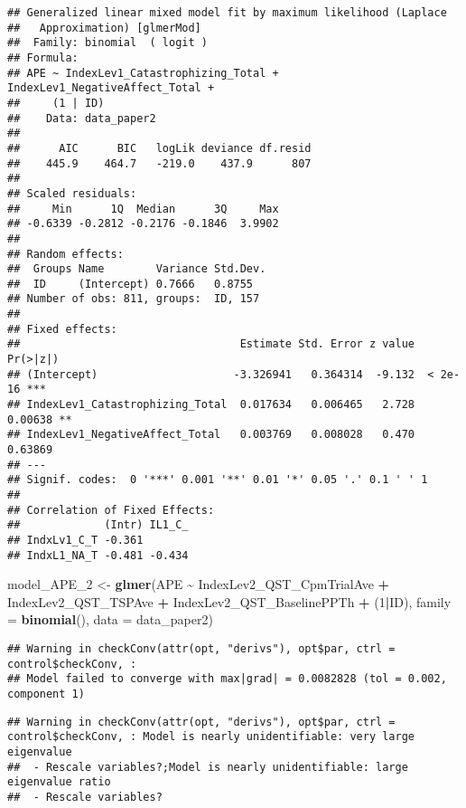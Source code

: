 \documentclass[
  12pt,
]{article}
\newenvironment{Shaded}{\begin{snugshade}}{\end{snugshade}}
\newcommand{\AttributeTok}[1]{\textcolor[rgb]{0.13,0.29,0.53}{#1}}
\newcommand{\DecValTok}[1]{\textcolor[rgb]{0.00,0.00,0.81}{#1}}
\newcommand{\FunctionTok}[1]{\textcolor[rgb]{0.13,0.29,0.53}{\textbf{#1}}}
\newcommand{\NormalTok}[1]{#1}
\newcommand{\OtherTok}[1]{\textcolor[rgb]{0.56,0.35,0.01}{#1}}
\newcommand{\SpecialCharTok}[1]{\textcolor[rgb]{0.81,0.36,0.00}{\textbf{#1}}}
\begin{document}
\begin{verbatim}
## Generalized linear mixed model fit by maximum likelihood (Laplace
##   Approximation) [glmerMod]
##  Family: binomial  ( logit )
## Formula: 
## APE ~ IndexLev1_Catastrophizing_Total + IndexLev1_NegativeAffect_Total +  
##     (1 | ID)
##    Data: data_paper2
## 
##      AIC      BIC   logLik deviance df.resid 
##    445.9    464.7   -219.0    437.9      807 
## 
## Scaled residuals: 
##     Min      1Q  Median      3Q     Max 
## -0.6339 -0.2812 -0.2176 -0.1846  3.9902 
## 
## Random effects:
##  Groups Name        Variance Std.Dev.
##  ID     (Intercept) 0.7666   0.8755  
## Number of obs: 811, groups:  ID, 157
## 
## Fixed effects:
##                                  Estimate Std. Error z value Pr(>|z|)    
## (Intercept)                     -3.326941   0.364314  -9.132  < 2e-16 ***
## IndexLev1_Catastrophizing_Total  0.017634   0.006465   2.728  0.00638 ** 
## IndexLev1_NegativeAffect_Total   0.003769   0.008028   0.470  0.63869    
## ---
## Signif. codes:  0 '***' 0.001 '**' 0.01 '*' 0.05 '.' 0.1 ' ' 1
## 
## Correlation of Fixed Effects:
##             (Intr) IL1_C_
## IndxLv1_C_T -0.361       
## IndxL1_NA_T -0.481 -0.434
\end{verbatim}

\begin{Shaded}
\begin{Highlighting}[]
\NormalTok{model\_APE\_2 }\OtherTok{\textless{}{-}} \FunctionTok{glmer}\NormalTok{(APE }\SpecialCharTok{\textasciitilde{}}\NormalTok{ IndexLev2\_QST\_CpmTrialAve }\SpecialCharTok{+}\NormalTok{ IndexLev2\_QST\_TSPAve }\SpecialCharTok{+}\NormalTok{ IndexLev2\_QST\_BaselinePPTh }\SpecialCharTok{+}\NormalTok{ (}\DecValTok{1}\SpecialCharTok{|}\NormalTok{ID), }\AttributeTok{family =} \FunctionTok{binomial}\NormalTok{(), }\AttributeTok{data =}\NormalTok{ data\_paper2)}
\end{Highlighting}
\end{Shaded}

\begin{verbatim}
## Warning in checkConv(attr(opt, "derivs"), opt$par, ctrl = control$checkConv, :
## Model failed to converge with max|grad| = 0.0082828 (tol = 0.002, component 1)
\end{verbatim}

\begin{verbatim}
## Warning in checkConv(attr(opt, "derivs"), opt$par, ctrl = control$checkConv, : Model is nearly unidentifiable: very large eigenvalue
##  - Rescale variables?;Model is nearly unidentifiable: large eigenvalue ratio
##  - Rescale variables?
\end{verbatim}
\end{document}
